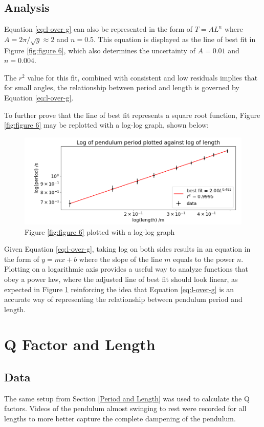 \documentclass[12pt]{article}
\begin{document}
{{\subsection{Analysis}
Equation \ref{eq:l-over-g} can also be represented in the form of $T = AL^n$ where $A = 2\pi/\sqrt{g} \approx 2$ and $n = 0.5$. This equation is displayed as the line of best fit in Figure \ref{fig:figure 6}, which also determines the uncertainty of $A = 0.01$ and $n = 0.004$.

The $r^2$ value for this fit, combined with consistent and low residuals implies that for small angles, the relationship between period and length is governed by Equation \ref{eq:l-over-g}.

To further prove that the line of best fit represents a square root function, Figure \ref{fig:figure 6} may be replotted with a log-log graph, shown below:

\begin{figure}
    \centering
    \includegraphics[width=\textwidth]{../figures/period_vs_length_log.png}
    \caption[]{Figure \ref{fig:figure 6} plotted with a log-log graph}
    \label{fig:figure 7}
\end{figure}

Given Equation \ref{eq:l-over-g}, taking log on both sides results in an equation in the form of $y = mx + b$ where the slope of the line $m$ equals to the power $n$. Plotting on a logarithmic axis provides a useful way to analyze functions that obey a power law, where the adjusted line of best fit should look linear, as expected in Figure \ref{fig:figure 7} reinforcing the idea that Equation \ref{eq:l-over-g} is an accurate way of representing the relationship between pendulum period and length.

\section{Q Factor and Length}

\subsection{Data}
The same setup from Section \ref{Period and Length} was used to calculate the Q factors. Videos of the pendulum almost swinging to rest were recorded for all lengths to more better capture the complete dampening of the pendulum.

}}
\end{document}
